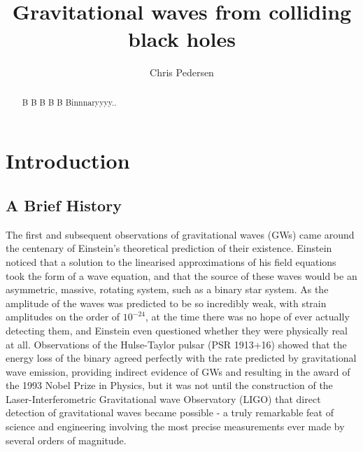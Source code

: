 \documentclass[]{article}
\title{Gravitational waves from colliding black holes}
\author{Chris Pedersen}
\begin{document}
\maketitle

\begin{abstract}
B B B B B Binnnaryyyy.. 
\end{abstract}

\section{Introduction}
\subsection{A Brief History}
The first\cite{obs} and subsequent\cite{obs2} observations of gravitational waves (GWs) came around the centenary of Einstein's theoretical prediction of their existence\cite{eins1}\cite{eins2}. Einstein noticed that a solution to the linearised approximations of his field equations took the form of a wave equation\cite{gw1}, and that the source of these waves would be an asymmetric, massive, rotating system, such as a binary star system. As the amplitude of the waves was predicted to be so incredibly weak, with strain amplitudes on the order of $10^{-24}$, at the time there was no hope of ever actually detecting them, and Einstein even questioned whether they were physically real at all\cite{eins3}. Observations of the Hulse-Taylor pulsar (PSR 1913+16)\cite{hulse} showed that the energy loss of the binary agreed perfectly with the rate predicted by gravitational wave emission, providing indirect evidence of GWs and resulting in the award of the 1993 Nobel Prize in Physics, but it was not until the construction of the Laser-Interferometric Gravitational wave Observatory (LIGO) that direct detection of gravitational waves became possible - a truly remarkable feat of science and engineering involving the most precise measurements ever made by several orders of magnitude.
\end{document}
